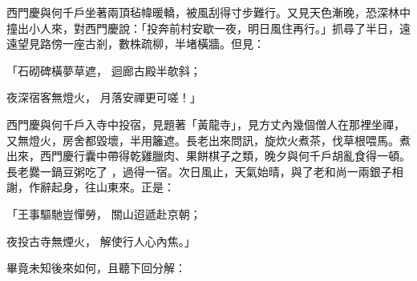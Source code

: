 \begin{showcontents}{}
西門慶與何千戶坐著兩頂毡幃暖轎，被風刮得寸步難行。又見天色漸晚，恐深林中撞出小人來，對西門慶說：「投奔前村安歇一夜，明日風住再行。」抓尋了半日，遠遠望見路傍一座古剎，數株疏柳，半堵橫牆。但見：

「石砌碑橫夢草遮，  迴廊古殿半欹斜；

夜深宿客無燈火，  月落安禪更可嗟！」

西門慶與何千戶入寺中投宿，見題著「黃龍寺」，見方丈內幾個僧人在那裡坐禪，又無燈火，房舍都毀壞，半用籬遮。長老出來問訊，旋炊火煮茶，伐草根喂馬。煮出來，西門慶行囊中帶得乾雞臘肉、果餅棋子之類，晚夕與何千戶胡亂食得一頓。長老爨一鍋豆粥吃了 ，過得一宿。次日風止，天氣始晴，與了老和尚一兩銀子相謝，作辭起身，往山東來。正是：

「王事驅馳豈憚勞，  關山迢遞赴京朝；

夜投古寺無煙火，  解使行人心內焦。」

畢竟未知後來如何，且聽下回分解：






\end{showcontents}


